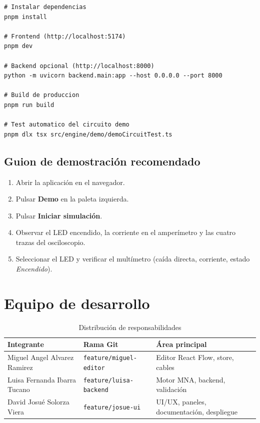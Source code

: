 \documentclass[12pt,a4paper]{article}
\begin{document}
\begin{lstlisting}
# Instalar dependencias
pnpm install

# Frontend (http://localhost:5174)
pnpm dev

# Backend opcional (http://localhost:8000)
python -m uvicorn backend.main:app --host 0.0.0.0 --port 8000

# Build de produccion
pnpm run build

# Test automatico del circuito demo
pnpm dlx tsx src/engine/demo/demoCircuitTest.ts
\end{lstlisting}

\subsection{Guion de demostración recomendado}

\begin{enumerate}[label=\arabic*.]
  \item Abrir la aplicación en el navegador.
  \item Pulsar \textbf{Demo} en la paleta izquierda.
  \item Pulsar \textbf{Iniciar simulación}.
  \item Observar el LED encendido, la corriente en el amperímetro y las cuatro trazas del osciloscopio.
  \item Seleccionar el LED y verificar el multímetro (caída directa, corriente, estado \textit{Encendido}).
\end{enumerate}

\section{Equipo de desarrollo}

\begin{table}[H]
  \centering
  \begin{tabular}{lll}
    \toprule
    \textbf{Integrante} & \textbf{Rama Git} & \textbf{Área principal} \\
    \midrule
    Miguel Angel Alvarez Ramirez & \texttt{feature/miguel-editor} & Editor React Flow, store, cables \\
    Luisa Fernanda Ibarra Tucano & \texttt{feature/luisa-backend} & Motor MNA, backend, validación \\
    David Josué Solorza Viera & \texttt{feature/josue-ui} & UI/UX, paneles, documentación, despliegue \\
    \bottomrule
  \end{tabular}
  \caption{Distribución de responsabilidades}
\end{table}
\end{document}
